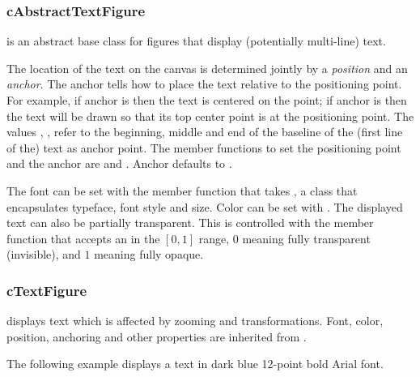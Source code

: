 \subsubsection{cAbstractTextFigure}
\label{sec:graphics:abstracttextfigure}

 is an abstract base class for figures that
display (potentially multi-line) text.

The location of the text on the canvas is determined jointly by a
\textit{position} and an \textit{anchor}. The anchor tells how to
place the text relative to the positioning point. For example,
if anchor is  then the text is centered on the point;
if anchor is  then the text will be drawn so that its top
center point is at the positioning point. The values
, ,
 refer to the beginning, middle and end of the
baseline of the (first line of the) text as anchor point. The member
functions to set the positioning point and the anchor are
 and . Anchor defaults to
.

The font can be set with the  member function that takes
, a class that encapsulates typeface, font style and
size. Color can be set with . The displayed text can
also be partially transparent. This is controlled with the 
member function that accepts an  in the $[0,1]$ range, $0$ meaning
fully transparent (invisible), and $1$ meaning fully opaque.


\subsubsection{cTextFigure}
\label{sec:graphics:textfigure}

 displays text which is affected by zooming and
transformations. Font, color, position, anchoring and other properties are
inherited from .

The following example displays a text in dark blue 12-point bold Arial
font.


